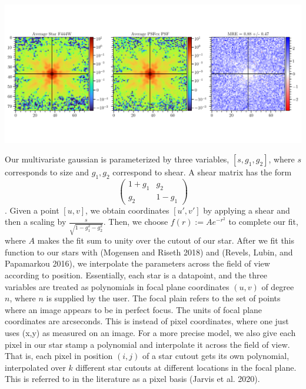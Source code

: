 \documentclass[10pt,a4paper,onecolumn]{article}
\let\origfigure\figure
\let\endorigfigure\endfigure
\renewenvironment{figure}[1][2] {
    \expandafter\origfigure\expandafter[H]
} {
    \endorigfigure
}
\let\textttOrig=\texttt
\def\texttt#1{\expandafter\textttOrig{\seqsplit{#1}}}
\begin{document}
\begin{figure}
\centering
\includegraphics{spikey.png}
\caption{The plot on the left shows the average cutout of all of the
stars in a supplied catalog. Likewise, plot in the middle shows the
average point spread function model. The plot on the right shows the
average normalized error between the observed star cutouts and the point
spread function model.}
\end{figure}

Our multivariate gaussian is parameterized by three variables,
\([s, g_1, g_2]\), where \(s\) corresponds to size and \(g_1 , g_2\)
correspond to shear. A shear matrix has the form \[\begin{pmatrix}
1 + g_1 & g_2 \\
g_2 & 1 - g_1
\end{pmatrix}
\]. Given a point \([u, v]\), we obtain coordinates \([u' , v']\) by
applying a shear and then a scaling by
\(\frac{s}{\sqrt{1 - g_1^2 - g_2^2}}\). Then, we choose
\(f(r) := Ae^{-r^2}\) to complete our fit, where \(A\) makes the fit sum
to unity over the cutout of our star. After we fit this function to our
stars with \texttt{Optim.jl} (Mogensen and Riseth 2018) and
\texttt{ForwardDiff.jl} (Revels, Lubin, and Papamarkou 2016), we
interpolate the parameters across the field of view according to
position. Essentially, each star is a datapoint, and the three variables
are treated as polynomials in focal plane coordinates \((u,v)\) of
degree \(n\), where \(n\) is supplied by the user. The focal plain
refers to the set of points where an image appears to be in perfect
focus. The units of focal plane coordinates are arcseconds. This is
instead of pixel coordinates, where one just uses (x,y) as measured on
an image. For a more precise model, we also give each pixel in our star
stamp a polynomial and interpolate it across the field of view. That is,
each pixel in position \((i,j)\) of a star cutout gets its own
polynomial, interpolated over \(k\) different star cutouts at different
locations in the focal plane. This is referred to in the literature as a
pixel basis (Jarvis et al. 2020).
\end{document}
